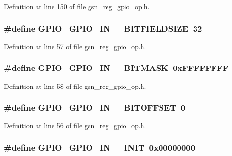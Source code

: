 Definition at line 150 of file gsn\_\-reg\_\-gpio\_\-op.h.

\hypertarget{a00553_aaaa37fd5f23b4c1d173c7b6ac3ca3895}{
\subsubsection[{GPIO\_\-GPIO\_\-IN\_\-0\_\-BITFIELDSIZE}]{\setlength{\rightskip}{0pt plus 5cm}\#define GPIO\_\-GPIO\_\-IN\_\_\-BITFIELDSIZE~32}}
\label{a00553_aaaa37fd5f23b4c1d173c7b6ac3ca3895}


Definition at line 57 of file gsn\_\-reg\_\-gpio\_\-op.h.

\hypertarget{a00553_aed93c86b991e425bf14af327fd2a4a88}{
\subsubsection[{GPIO\_\-GPIO\_\-IN\_\-0\_\-BITMASK}]{\setlength{\rightskip}{0pt plus 5cm}\#define GPIO\_\-GPIO\_\-IN\_\_\-BITMASK~0xFFFFFFFF}}
\label{a00553_aed93c86b991e425bf14af327fd2a4a88}


Definition at line 58 of file gsn\_\-reg\_\-gpio\_\-op.h.

\hypertarget{a00553_ab8c7701a197c66b2717665c99fe1f8e2}{
\subsubsection[{GPIO\_\-GPIO\_\-IN\_\-0\_\-BITOFFSET}]{\setlength{\rightskip}{0pt plus 5cm}\#define GPIO\_\-GPIO\_\-IN\_\_\-BITOFFSET~0}}
\label{a00553_ab8c7701a197c66b2717665c99fe1f8e2}


Definition at line 56 of file gsn\_\-reg\_\-gpio\_\-op.h.

\hypertarget{a00553_a9f6d23c659623d44079bc940aaffc8ba}{
\subsubsection[{GPIO\_\-GPIO\_\-IN\_\-0\_\-INIT}]{\setlength{\rightskip}{0pt plus 5cm}\#define GPIO\_\-GPIO\_\-IN\_\_\-INIT~0x00000000}}
\label{a00553_a9f6d23c659623d44079bc940aaffc8ba}


